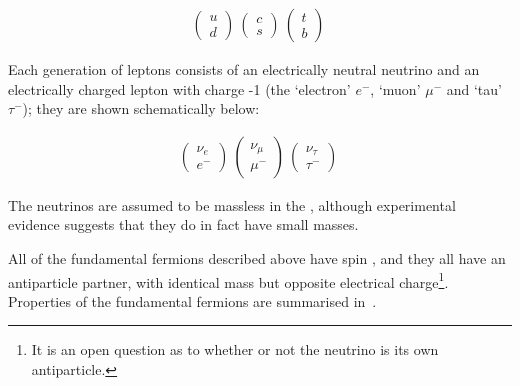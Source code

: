 \begin{align}
\left( \begin{array}{c} u \\ d \end{array} \right) \ 
\left( \begin{array}{c} c \\ s \end{array} \right) \ 
\left( \begin{array}{c} t \\ b \end{array} \right) \ 
\end{align}

Each generation of leptons consists of an electrically neutral neutrino
and an electrically charged lepton with charge -1 (the `electron' $e^{-}$, `muon' $\mu^{-}$ and
`tau' $\tau^{-}$); they are shown schematically below:

\begin{align}
\left( \begin{array}{c} \nu_{e} \\ e^{-} \end{array} \right) \ 
\left( \begin{array}{c} \nu_{\mu} \\ \mu^{-} \end{array} \right) \ 
\left( \begin{array}{c} \nu_{\tau} \\ \tau^{-} \end{array} \right) \ 
\end{align} 

The neutrinos are assumed to be massless in the \sm, although experimental
evidence suggests that they do in fact have small masses.

All of the fundamental fermions described above have spin , and they all have an antiparticle partner, with
identical mass but opposite electrical charge\footnote{It is an open question
as to whether or not the neutrino is its own antiparticle.}.
Properties of the fundamental fermions are summarised in~.


